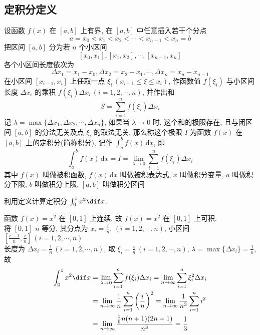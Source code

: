 \documentclass[color=green,titlestyle=hang]{elegantbook}%
\begin{document}
\subsection{定积分定义}

\begin{newdef}[定积分]
设函数 $f(x)$ 在 $[a,b]$ 上有界, 在 $[a,b]$ 中任意插入若干个分点\[a=x_0<x_1<x_2<\cdots<x_{n-1}<x_n=b\]
把区间 $[a,b]$ 分为若 $n$ 个小区间 \[[x_0,x_1],[x_1,x_2],\cdots,[x_{n-1},x_n]\]
各个小区间长度依次为\[\Delta x_1=x_1-x_0,\Delta x_2=x_2-x_1,\cdots,\Delta x_n=x_n-x_{n-1}\]
在小区间 $[x_{i-1},x_i]$ 上任取一点 $\xi_i$\,$(x_{i-1}\leqslant\xi\leqslant x_{i})$,  作函数值 $f(\xi_i)$ 与小区间长度 $\Delta x_i$ 的乘积 $f(\xi_i)\Delta x_i\,(i=1,2,\cdots,n)$, 并作出和
\[S=\sum_{i=1}^{n}f(\xi_i)\Delta x_i\]
记 $\lambda=\max\{\Delta x_1,\Delta x_2,\cdots,\Delta x_n\}$, 如果当 $\lambda\to0$ 时, 这个和的极限存在, 且与闭区间 $[a,b]$ 的分法无关及点 $\xi_i$ 的取法无关, 那么称这个极限 $I$ 为函数 $f(x)$ 在 $[a,b]$ 上的定积分(简称积分), 记作 $\int_a^bf(x)\,\mathrm{d}x$, 即\[\int_a^bf(x)\,\mathrm{d}x=I=\lim_{\lambda\to0}\sum_{i=1}^{n}f(\xi_i)\Delta x_i\]
其中 $f(x)$ 叫做被积函数, $f(x)\,\mathrm{d}x$ 叫做被积表达式, $x$ 叫做积分变量, $a$ 叫做积分下限, $b$ 叫做积分上限, $[a,b]$ 叫做积分区间	
\end{newdef}

\begin{example}
利用定义计算定积分 $\int_0^1x^2\dif x$.
\end{example}\begin{solution}函数  $f(x)=x^2$ 在  $[0,1]$  上连续, 故 $f(x)=x^2$ 在  $[0,1]$  上可积.\\
将 $[0,1]$ $n$ 等分, 其分点为 $x_i=\frac{i}{n},\,(i=1,2,\cdots,n)$, 小区间 $\left[\frac{i-1}{n},\frac{i}{n}\right]\,(i=1,2,\cdots,n)$ \\
长度为 $\Delta x_i=\frac{1}{n}\,(i=1,2,\cdots,n)$, 
取 $\xi_i=\frac{i}{n}\,(i=1,2,\cdots,n)$, $\lambda=\max\{\Delta x_i\}=\frac{1}{n}$, 故
\begin{align*}
\int_0^1x^2\dif x
&=\lim_{\lambda\to0}\sum_{i=1}^{n}f(\xi_i)\Delta x_i=\lim_{n\to\infty}\sum_{i=1}^{n}\xi_i^2\Delta x_i\\
&=\lim_{n\to\infty}\frac{1}{n}\sum_{i=1}^{n}\left(\frac{i}{n}\right)^2=\lim_{n\to\infty}\frac{1}{n^3}\sum_{i=1}^{n}i^2\\
&=\lim_{n\to\infty}\frac{\frac{1}{6}n(n+1)(2n+1)}{n^3}=\frac{1}{3}
\end{align*}	
\end{solution}
\end{document}
